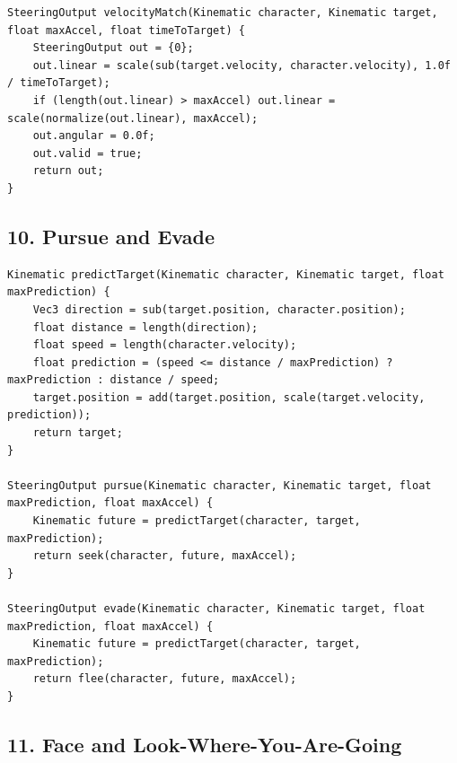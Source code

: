 \documentclass[10pt,letterpaper]{article}
\begin{document}
\begin{verbatim}
SteeringOutput velocityMatch(Kinematic character, Kinematic target, float maxAccel, float timeToTarget) {
    SteeringOutput out = {0};
    out.linear = scale(sub(target.velocity, character.velocity), 1.0f / timeToTarget);
    if (length(out.linear) > maxAccel) out.linear = scale(normalize(out.linear), maxAccel);
    out.angular = 0.0f;
    out.valid = true;
    return out;
}
\end{verbatim}

\subsection*{10. Pursue and Evade}
{}

\begin{verbatim}
Kinematic predictTarget(Kinematic character, Kinematic target, float maxPrediction) {
    Vec3 direction = sub(target.position, character.position);
    float distance = length(direction);
    float speed = length(character.velocity);
    float prediction = (speed <= distance / maxPrediction) ? maxPrediction : distance / speed;
    target.position = add(target.position, scale(target.velocity, prediction));
    return target;
}

SteeringOutput pursue(Kinematic character, Kinematic target, float maxPrediction, float maxAccel) {
    Kinematic future = predictTarget(character, target, maxPrediction);
    return seek(character, future, maxAccel);
}

SteeringOutput evade(Kinematic character, Kinematic target, float maxPrediction, float maxAccel) {
    Kinematic future = predictTarget(character, target, maxPrediction);
    return flee(character, future, maxAccel);
}
\end{verbatim}

\subsection*{11. Face and Look-Where-You-Are-Going}
{}
\end{document}
